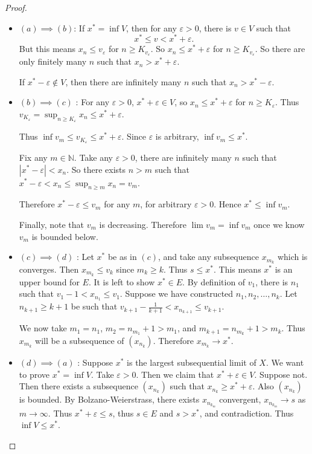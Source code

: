 \begin{proof}
	\begin{itemize}
		\item $(a)\implies(b)$: If $x^* = \operatorname{inf} V$, then for any $\varepsilon>0$, there is $v \in V$ such that \[
			x^* \le v < x^* + \varepsilon
		.\] 
		But this means $x_n \le v_\varepsilon$ for $n \ge K_{v_\varepsilon}$. So $x_n \le x^* + \varepsilon$ for $n \ge  K_{v_\varepsilon}$. So there are only finitely many $n$ such that $x_n > x^* + \varepsilon$.

		If $x^* - \varepsilon \not\in V$, then there are infinitely many  $n$ such that $x_n > x^* - \varepsilon$.
	\item $(b)\implies(c)$ : 
		For any  $\varepsilon>0$, $x^* + \varepsilon \in V$, so $x_n \le x^* + \varepsilon$ for $n \ge K_\varepsilon$. Thus $v_{K_\varepsilon} = \operatorname{sup}_{n \ge K_\varepsilon} x_n \le  x^* + \varepsilon$.

		Thus $\operatorname{inf} v_m \le v_{K_\varepsilon}\le x^* + \varepsilon$. Since $\varepsilon$ is arbitrary, $\operatorname{inf} v_m \le x^*$.

		Fix any $m \in \mathbb{N}$. Take any $\varepsilon>0$, there are infinitely many $n$ such that $|x^* - \varepsilon| < x_n$. So there exists $n > m$ such that $x^* - \varepsilon < x_n \le \operatorname{sup}_{n\ge m}x_n = v_m$.

		Therefore $x^* - \varepsilon \le v_m$ for any $m$, for arbitrary $\varepsilon > 0$. Hence $x^* \le \operatorname{inf}  v_m$.

		Finally, note that $v_m$ is decreasing. Therefore $\lim v_m = \inf v_m$ once we know $v_m$ is bounded below.
	\item $(c) \implies (d)$ : Let $x^*$ be as in $(c)$, and take any subsequence $x_{m_k}$ which is converges.  Then $x_{m_k}\le v_k$ since $m_k \ge k$. Thus $s \le x^*$. This means $x^*$ is an upper bound for $E$. 
		It is left to show $x^* \in  E$. 
		By definition of $v_1$, there is $n_1$ such that $v_1 - 1 < x_{n_1}\le v_1$. Suppose we have constructed $n_1, n_2, \ldots, n_k$. Let $n_{k+1}\ge k+1$ be such that $v_{k+1}- \frac{1}{k+1} < x_{n_{k+1}} \le v_{k+1}$.

		We now take $m_1 = n_1$, $m_2 = n_{m_1}+1 > m_1$, and $m_{k+1} = n_{m_k}+1 > m_k$. Thus $x_{m_k}$ will be a subsequence of $\left( x_{n_k} \right) $. Therefore $x_{m_k} \to x^*$.
	\item $(d) \implies(a)$ : Suppose $x^*$ is the largest subsequential limit of $X$. We want to prove $x^* = \operatorname{inf} V$. Take $\varepsilon>0$. Then we claim that $x^* + \varepsilon \in V$. Suppose not. Then there exists a subsequence $\left( x_{n_k} \right) $ such that $x_{n_k}\ge x^*+\varepsilon$. Also $(x_{n_k})$ is bounded. By Bolzano-Weierstrass, there exists $x_{n_{k_m}}$ convergent, $x_{n_{k_m}}\to s$ as $m\to \infty $. Thus  $x^* + \varepsilon \le s$, thus $s \in E$ and $s>x^*$, and contradiction. Thus $\operatorname{inf} V\le x^*$.


\end{itemize}
\end{proof}

